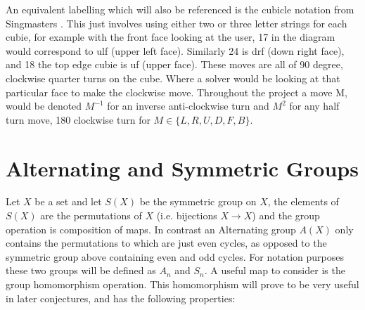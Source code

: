 \documentclass{article}
\newcounter{prop}[section]\setcounter{prop}{0}
\newcounter{lem}[section]\setcounter{lem}{0}
\begin{document}
An equivalent labelling which will also be referenced is the cubicle notation from Singmasters \cite{Magic}. This just involves using either two or three letter strings for each cubie, for example with the front face looking at the user, 17 in the diagram would correspond to ulf (upper left face). Similarly 24 is drf (down right face), and 18 the top edge cubie is uf (upper face).
These moves are all of 90 degree, clockwise quarter turns on the cube. Where a solver would be looking at that particular face to make the clockwise move. Throughout the project a move M, would be denoted $M^{-1}$ for an inverse anti-clockwise turn and $M^{2}$ for any half turn move, 180 clockwise turn for $M \in \{L,R,U,D,F,B\}$.

\newpage
\section{Alternating and Symmetric Groups}
Let $X$ be a set and let $S(X)$ be the symmetric group on $X$, the elements of $S(X)$ are the permutations of $X$ (i.e. bijections $X\rightarrow X$) and the group operation is
composition of maps.
In contrast an Alternating group $A(X)$ only contains the permutations to which are just even cycles, as opposed to the symmetric group above containing even and odd cycles. For notation purposes these two groups will be defined as $A_{n}$ and $S_{n}$. \newline A useful map to consider is the group homomorphism operation. This homomorphism will prove to be very useful in later conjectures, and has the following properties:
\end{document}
